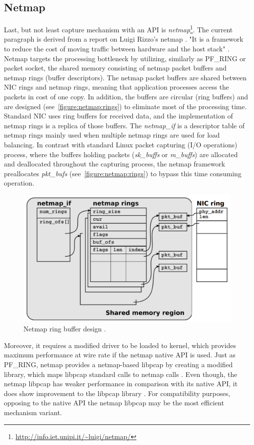 \documentclass[12pt,a4paper,twoside]{book}
\begin{document}
        \subsection{Netmap} \label{analysis:mechs:netmap}
            Last, but not least capture mechanism with an API is \emph{netmap}\footnote{\url{http://info.iet.unipi.it/~luigi/netmap/}}. The current paragraph is derived from a report on Luigi Rizzo's netmap \cite{report:netmap}. "It is a framework to reduce the cost of moving traffic between hardware and the host stack" \cite{report:netmap}. Netmap targets the processing bottleneck by utilizing, similarly as PF\_RING or packet socket, the shared memory consisting of netmap packet buffers and netmap rings (buffer descriptors). The netmap packet buffers are shared between NIC rings and netmap rings, meaning that application processes access the packets in cost of one copy. In addition, the buffers are circular (ring buffers) and are designed (see~\autoref{figure:netmap:rings}) to eliminate most of the processing time. Standard NIC uses ring buffers for received data, and the implementation of netmap rings is a replica of those buffers. The \emph{netmap\_if} is a descriptor table of netmap rings mainly used when multiple netmap rings are used for load balancing. In contrast with standard Linux packet capturing (I/O operations) process, where the buffers holding packets (\emph{sk\_buffs} or \emph{m\_buffs}) are allocated and deallocated throughout the capturing process, the netmap framework preallocates \emph{pkt\_bufs} (see~\autoref{figure:netmap:rings}) to bypass this time consuming operation.\par
            \begin{figure}
                \centering
                \includegraphics[scale=0.3]{netmap_rings}
                \caption{Netmap ring buffer design \cite{image:netmap}.}
                \label{figure:netmap:rings}
            \end{figure}
            Moreover, it requires a modified driver to be loaded to kernel, which provides maximum performance at wire rate if the netmap native API is used. Just as PF\_RING, netmap provides a netmap-based libpcap by creating a modified library, which maps libpcap standard calls to netmap calls \cite{report:netmap}. Even though, the netmap libpcap has weaker performance in comparison with its native API, it does show improvement to the libpcap library \cite{video:netmap}. For compatibility purposes, opposing to the native API the netmap libpcap may be the most efficient mechanism variant.
\end{document}
